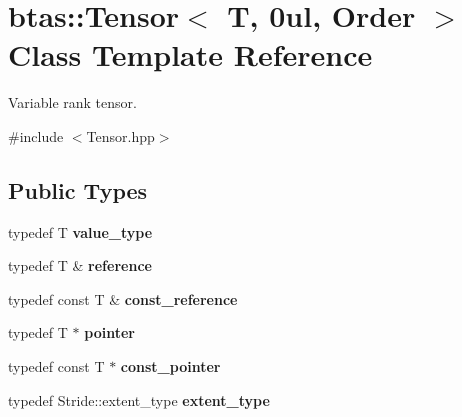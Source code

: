 \hypertarget{classbtas_1_1_tensor_3_01_t_00_010ul_00_01_order_01_4}{
\section{btas::Tensor$<$ T, 0ul, Order $>$ Class Template Reference}
\label{classbtas_1_1_tensor_3_01_t_00_010ul_00_01_order_01_4}
}


Variable rank tensor.  


{\ttfamily \#include $<$Tensor.hpp$>$}\subsection*{Public Types}
\begin{DoxyCompactItemize}
\item 
\hypertarget{classbtas_1_1_tensor_3_01_t_00_010ul_00_01_order_01_4_ad378ba218f8e86f1abcebad30e9118a5}{
typedef T {\bfseries value\_\-type}}
\label{classbtas_1_1_tensor_3_01_t_00_010ul_00_01_order_01_4_ad378ba218f8e86f1abcebad30e9118a5}

\item 
\hypertarget{classbtas_1_1_tensor_3_01_t_00_010ul_00_01_order_01_4_ab7a7581b3c1d5012a8f86eabcaf56d99}{
typedef T \& {\bfseries reference}}
\label{classbtas_1_1_tensor_3_01_t_00_010ul_00_01_order_01_4_ab7a7581b3c1d5012a8f86eabcaf56d99}

\item 
\hypertarget{classbtas_1_1_tensor_3_01_t_00_010ul_00_01_order_01_4_a73af955da443b9be833de4954e796c2b}{
typedef const T \& {\bfseries const\_\-reference}}
\label{classbtas_1_1_tensor_3_01_t_00_010ul_00_01_order_01_4_a73af955da443b9be833de4954e796c2b}

\item 
\hypertarget{classbtas_1_1_tensor_3_01_t_00_010ul_00_01_order_01_4_a2be5f827b78d0e41dd56c4aa76a5283d}{
typedef T $\ast$ {\bfseries pointer}}
\label{classbtas_1_1_tensor_3_01_t_00_010ul_00_01_order_01_4_a2be5f827b78d0e41dd56c4aa76a5283d}

\item 
\hypertarget{classbtas_1_1_tensor_3_01_t_00_010ul_00_01_order_01_4_a7c4f3dcc5c14cb570eca18ab81ad1d62}{
typedef const T $\ast$ {\bfseries const\_\-pointer}}
\label{classbtas_1_1_tensor_3_01_t_00_010ul_00_01_order_01_4_a7c4f3dcc5c14cb570eca18ab81ad1d62}

\item 
\hypertarget{classbtas_1_1_tensor_3_01_t_00_010ul_00_01_order_01_4_a3367c4717c20f0edcec091fc3b5166c9}{
typedef Stride::extent\_\-type {\bfseries extent\_\-type}}
\label{classbtas_1_1_tensor_3_01_t_00_010ul_00_01_order_01_4_a3367c4717c20f0edcec091fc3b5166c9}


\end{DoxyCompactItemize}
